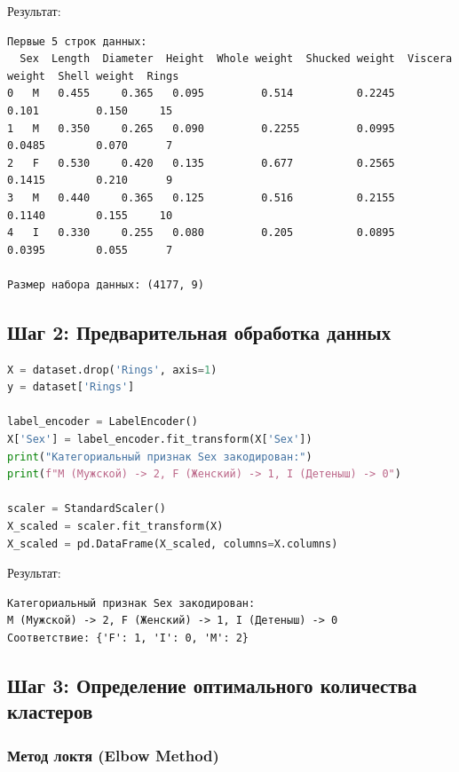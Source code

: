 Результат:

\begin{verbatim}
Первые 5 строк данных:
  Sex  Length  Diameter  Height  Whole weight  Shucked weight  Viscera weight  Shell weight  Rings
0   M   0.455     0.365   0.095         0.514          0.2245           0.101         0.150     15
1   M   0.350     0.265   0.090         0.2255         0.0995          0.0485        0.070      7
2   F   0.530     0.420   0.135         0.677          0.2565          0.1415        0.210      9
3   M   0.440     0.365   0.125         0.516          0.2155          0.1140        0.155     10
4   I   0.330     0.255   0.080         0.205          0.0895          0.0395        0.055      7

Размер набора данных: (4177, 9)
\end{verbatim}

\subsection{Шаг 2: Предварительная обработка данных}

\begin{lstlisting}[language=Python, caption=Кодирование категориальных признаков и масштабирование]
X = dataset.drop('Rings', axis=1)
y = dataset['Rings']

label_encoder = LabelEncoder()
X['Sex'] = label_encoder.fit_transform(X['Sex'])
print("Категориальный признак Sex закодирован:")
print(f"M (Мужской) -> 2, F (Женский) -> 1, I (Детеныш) -> 0")

scaler = StandardScaler()
X_scaled = scaler.fit_transform(X)
X_scaled = pd.DataFrame(X_scaled, columns=X.columns)
\end{lstlisting}

Результат:

\begin{verbatim}
Категориальный признак Sex закодирован:
M (Мужской) -> 2, F (Женский) -> 1, I (Детеныш) -> 0
Соответствие: {'F': 1, 'I': 0, 'M': 2}
\end{verbatim}

\subsection{Шаг 3: Определение оптимального количества кластеров}

\subsubsection{Метод локтя (Elbow Method)}

